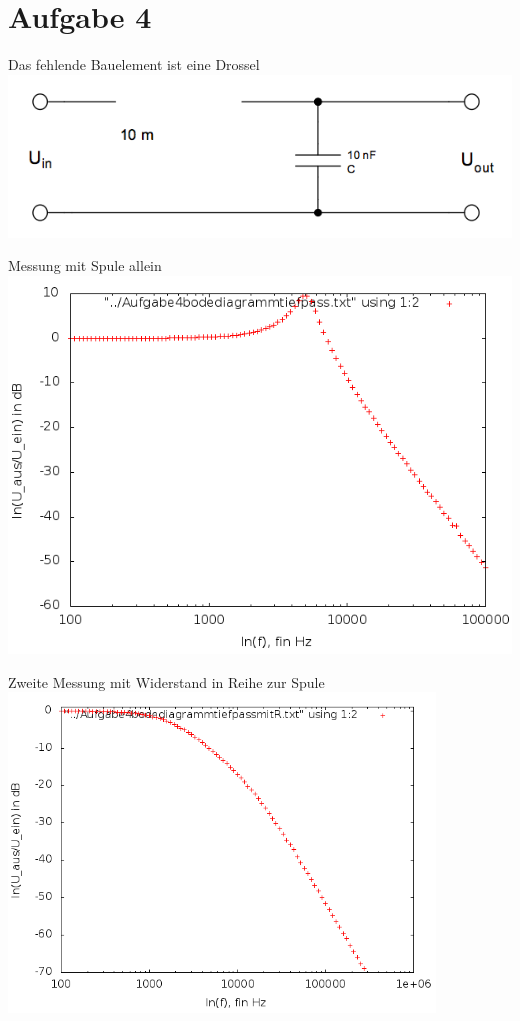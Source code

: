 \documentclass[compress,11pt]{beamer}
\begin{document}
\section{Aufgabe 4}
\begin{frame}
\begin{block}{Das fehlende Bauelement ist eine Drossel}
\centering
\includegraphics[width=\textwidth]{../daten/Messdaten/plots/schalt_4spule.png}
\end{block}
\end{frame}

\begin{frame}
\begin{block}{Messung mit Spule allein}
\centering
\includegraphics[width=.85\textwidth]{../daten/Messdaten/plots/Aufgabe4Bodediagramm_tief_gain}
\end{block}
\end{frame}

\begin{frame}
\begin{block}{Zweite Messung mit Widerstand in Reihe zur Spule}
\centering
\includegraphics[width=0.85\textwidth]{../daten/Messdaten/plots/Aufgabe4Bodediagramm_tief_R_gain}
\end{block}
\end{frame}
\end{document}
